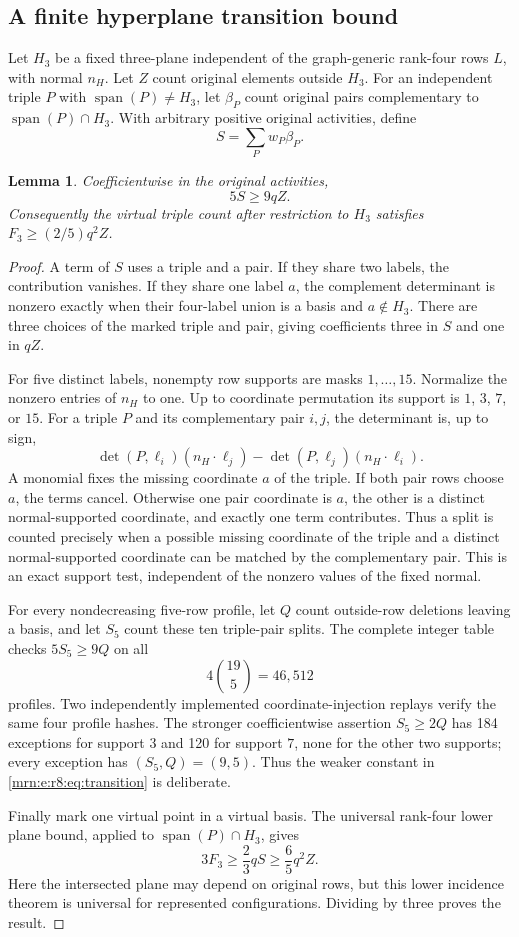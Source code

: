 \documentclass[11pt,a4paper]{article}
\newtheorem{lemma}[theorem]{Lemma}
\theoremstyle{remark}\newtheorem{remark}[theorem]{Remark}
\newcommand{\spn}{\operatorname{span}}     %
\begin{document}
\subsection{A finite hyperplane transition bound}
Let $H_3$ be a fixed three-plane independent of the graph-generic rank-four rows $L$, with normal $n_H$. Let $Z$ count original elements outside $H_3$. For an independent triple $P$ with $\spn(P)\ne H_3$, let $\beta_{P}$ count original pairs complementary to $\spn(P)\cap H_3$. With arbitrary positive original activities, define
\[
 S=\sum_P w_P\beta_P.
\]

\begin{lemma}\label{mrn:e:r8:lem:transition}
Coefficientwise in the original activities,
\begin{equation}\label{mrn:e:r8:eq:transition}
 5S\ge9qZ.
\end{equation}
Consequently the virtual triple count after restriction to $H_3$ satisfies $F_3\ge(2/5)q^2Z$.
\end{lemma}
\begin{proof}
A term of $S$ uses a triple and a pair. If they share two labels, the contribution vanishes. If they share one label $a$, the complement determinant is nonzero exactly when their four-label union is a basis and $a\notin H_3$. There are three choices of the marked triple and pair, giving coefficients three in $S$ and one in $qZ$.

For five distinct labels, nonempty row supports are masks $1,\ldots,15$. Normalize the nonzero entries of $n_H$ to one. Up to coordinate permutation its support is $1$, $3$, $7$, or $15$. For a triple $P$ and its complementary pair $i,j$, the determinant is, up to sign,
\[
 \det(P,\ell_i)(n_H\cdot\ell_j)
 -\det(P,\ell_j)(n_H\cdot\ell_i).
\]
A monomial fixes the missing coordinate $a$ of the triple. If both pair rows choose $a$, the terms cancel. Otherwise one pair coordinate is $a$, the other is a distinct normal-supported coordinate, and exactly one term contributes. Thus a split is counted precisely when a possible missing coordinate of the triple and a distinct normal-supported coordinate can be matched by the complementary pair. This is an exact support test, independent of the nonzero values of the fixed normal.

For every nondecreasing five-row profile, let $Q$ count outside-row deletions leaving a basis, and let $S_5$ count these ten triple-pair splits. The complete integer table checks $5S_5\ge9Q$ on all
\[
 4\binom{19}{5}=46{,}512
\]
profiles. Two independently implemented coordinate-injection replays verify the same four profile hashes. The stronger coefficientwise assertion $S_5\ge2Q$ has 184 exceptions for support $3$ and 120 for support $7$, none for the other two supports; every exception has $(S_5,Q)=(9,5)$. Thus the weaker constant in \eqref{mrn:e:r8:eq:transition} is deliberate.

Finally mark one virtual point in a virtual basis. The universal rank-four lower plane bound, applied to $\spn(P)\cap H_3$, gives
\[
 3F_3\ge\frac23qS\ge\frac65q^2Z.
\]
Here the intersected plane may depend on original rows, but this lower incidence theorem is universal for represented configurations. Dividing by three proves the result.
\end{proof}
\end{document}

